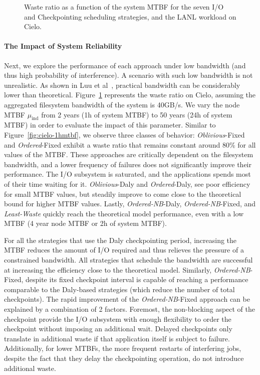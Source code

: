 \documentclass[two]{article}
\newcommand{\muind}{\mu_{\text{ind}}}
\newcommand{\nocoop}{\emph{Oblivious}\xspace}
\newcommand{\fifoblock}{\emph{Ordered}\xspace}
\newcommand{\fifononblock}{\emph{Ordered-NB}\xspace}
\newcommand{\leastwaste}{\emph{Least-Waste}\xspace}
\def\propfixed{\nocoop-Fixed\xspace}
\def\propdaly{\nocoop-Daly\xspace}
\def\bfifofixed{\fifoblock-Fixed\xspace}
\def\bfifodaly{\fifoblock-Daly\xspace}
\def\fifofixed{\fifononblock-Fixed\xspace}
\def\fifodaly{\fifononblock-Daly\xspace}
\def\cooperative{\leastwaste}
\begin{document}
\begin{figure}
  \begin{center}
    \resizebox{1.05\linewidth}{!}{}
  \end{center}
  \caption{Waste ratio as a function of the system MTBF for the
    seven I/O and Checkpointing scheduling strategies, and the LANL workload on
    Cielo. \label{fig:cielo-40gbs}}
\end{figure}

\paragraph{The Impact of System Reliability}
Next, we explore the performance of each approach under low bandwidth (and
thus high probability of interference). A scenario with such low bandwidth is not
unrealistic.  As shown in Luu et al~\cite{Luu:2015:Multiplatform}, practical
bandwidth can be considerably lower than theoretical.
Figure~\ref{fig:cielo-40gbs} represents the waste ratio on Cielo, assuming the
aggregated filesystem bandwidth of the system is 40GB/s. We vary the node MTBF
$\muind$ from 2 years (1h of system MTBF) to 50 years (24h of system MTBF) in
order to evaluate the impact of this parameter. Similar to
Figure~\ref{fig:cielo-1hmtbf}, we observe three classes of behavior: \propfixed
and \bfifofixed exhibit a waste ratio that remains constant around 80\% for all
values of the MTBF. These approaches are critically dependent on the filesystem
bandwidth, and a lower frequency of failures does not significantly improve
their performance. The I/O subsystem is saturated, and the applications spends
most of their time waiting for it.
%
\propdaly and \bfifodaly, see poor efficiency for small MTBF values, but
steadily improve to come close to the theoretical bound for higher MTBF values.
Lastly, \fifodaly, \fifofixed, and \cooperative quickly reach the theoretical
model performance, even with a low  MTBF (4 year node MTBF or 2h of
system MTBF).

For all the strategies that use the Daly checkpointing period, increasing the
MTBF reduces the amount of I/O required and thus relieves the pressure of a
constrained bandwidth. All strategies that schedule the bandwidth are
successful at increasing the efficiency close to the theoretical model.
%
Similarly, \fifofixed, despite its fixed checkpoint interval is capable of
reaching a performance comparable to the Daly-based strategies (which reduce the
number of total checkpoints). The rapid improvement of the \fifofixed approach can be
explained by a combination of 2 factors. Foremost, the non-blocking aspect of
the checkpoint provide the I/O subsystem with enough flexibility to order the
checkpoint without imposing an additional wait. Delayed checkpoints only translate
in additional waste if that application itself is subject to failure.
Additionally, for lower MTBFs, the more frequent restarts of interfering jobs,
despite the fact that they delay the checkpointing operation, do not introduce
additional waste.
\end{document}
